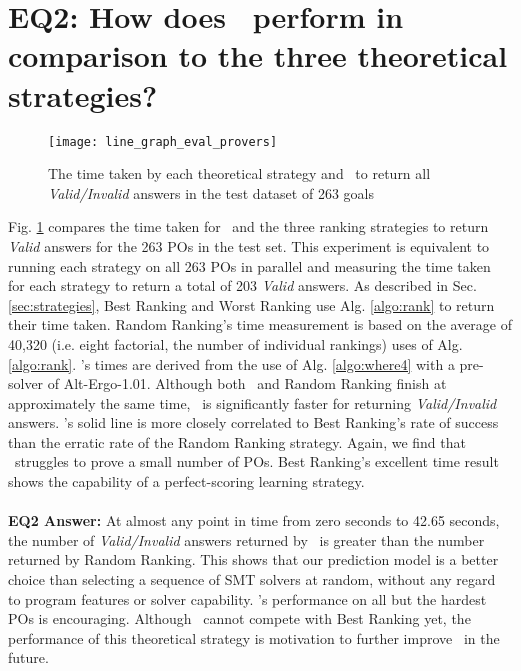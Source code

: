 \section{EQ2: How does \where~perform in comparison to the three theoretical strategies?}


\begin{figure}
	\centering
	\texttt{[image: line\_graph\_eval\_provers]}
	\caption{The time taken by each theoretical strategy and \where~to return all \textit{Valid/Invalid} answers in the test dataset of 263 goals}
	\label{fig:line_graph_eval_provers}
\end{figure}

Fig. \ref{fig:line_graph_eval_provers} compares the time taken for \where~and the three ranking strategies to return \textit{Valid} answers for the 263 POs in the test set.
This experiment is equivalent to running each strategy on all 263 POs in parallel and measuring the time taken for each strategy to return a total of 203 \textit{Valid} answers.
As described in Sec. \ref{sec:strategies}, \textsf{Best Ranking} and \textsf{Worst Ranking} use Alg. \ref{algo:rank} to return their time taken.
\textsf{Random Ranking}'s time measurement is based on the average of 40,320 (i.e. eight factorial, the number of individual rankings) uses of Alg. \ref{algo:rank}.
\where's times are derived from the use of Alg. \ref{algo:where4} with a pre-solver of Alt-Ergo-1.01. 
Although both \where~and \textsf{Random Ranking} finish at approximately the same time, \where~is significantly faster for returning \textit{Valid/Invalid} answers. 
\where's solid line is more closely correlated to \textsf{Best Ranking}'s rate of success than the erratic rate of the \textsf{Random Ranking} strategy. 
Again, we find that \where~struggles to prove a small number of POs.
\textsf{Best Ranking}'s excellent time result shows the capability of a perfect-scoring learning strategy. \\
\\
\textbf{EQ2 Answer:} At almost any point in time from zero seconds to 42.65 seconds, the number of \textit{Valid/Invalid} answers returned by \where~is greater than the number returned by \textsf{Random Ranking}.
This shows that our prediction model is a better choice than selecting a sequence of SMT solvers at random, without any regard to program features or solver capability.
\where's performance on all but the hardest POs is encouraging.
Although \where~cannot compete with \textsf{Best Ranking} yet, the performance of this theoretical strategy is motivation to further improve \where~in the future.   



